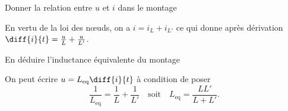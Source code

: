 


\begin{enonce}
Donner la relation entre $u$ et $i$ dans le montage \reponseB
\end{enonce}


\begin{corrige}
En vertu de la loi des n\oe uds, on a $i=i_L+i_{L'}$ ce qui donne après dérivation
$\diff{i}{t}=\frac{u}{L}+\frac{u}{L'}$.
\end{corrige}




\begin{enonce}
En déduire l'inductance équivalente du montage \reponseB
\end{enonce}


\begin{corrige}
On peut écrire $u=L_\text{eq}\diff{i}{t}$ à  condition de poser 
\[
\frac{1}{L_\text{eq}} = \frac{1}{L}+\frac{1}{L'}
\quad\text{soit}\quad
L_\text{eq} = \frac{LL'}{L+L'}.
\]
\end{corrige}


\finEntrainement






\hauteurLargeurCadreReponse		{6mm}{4cm}
\typeEntrainement				{} %
\initialisationEntrainement

